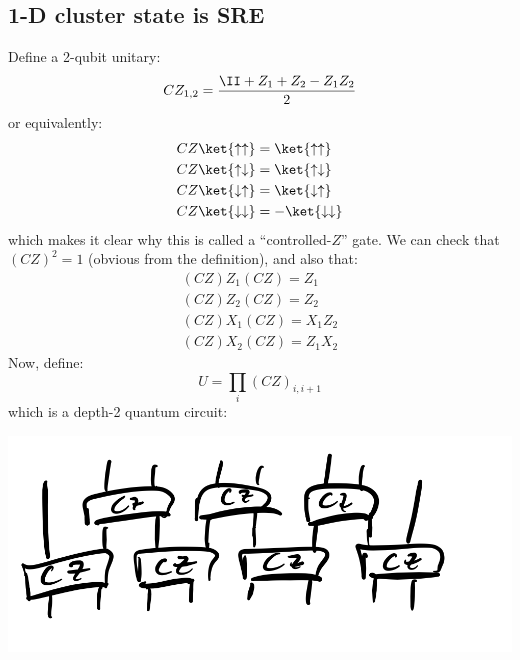 \subsection{1-D cluster state is SRE}
Define a 2-qubit unitary:
\begin{equation}
    CZ_{1,2} = \frac{\II + Z_1 + Z_2 - Z_1Z_2}{2}
\end{equation}
or equivalently:
\begin{equation}
    \begin{split}
        CZ\ket{\uparrow\uparrow} &= \ket{\uparrow\uparrow}
        \\ CZ\ket{\uparrow\downarrow} &= \ket{\uparrow\downarrow}
        \\ CZ\ket{\downarrow\uparrow} &= \ket{\downarrow\uparrow}
        \\ CZ\ket{\downarrow\downarrow} &= -\ket{\downarrow\downarrow}
    \end{split}
\end{equation}
which makes it clear why this is called a ``controlled-$Z$'' gate. We can check that $(CZ)^2 = 1$ (obvious from the definition), and also that:
\begin{equation}
    \begin{split}
        (CZ)Z_1(CZ) = Z_1
        \\ (CZ)Z_2(CZ) = Z_2
        \\ (CZ)X_1(CZ) = X_1Z_2
        \\ (CZ)X_2(CZ) = Z_1X_2
    \end{split}
\end{equation}
Now, define:
\begin{equation}
    U = \prod_i(CZ)_{i, i+1}
\end{equation}
which is a depth-2 quantum circuit:

\begin{center}
    \includegraphics[scale=0.35]{Lectures/Images/lec13-czcircuit.png}
\end{center}

